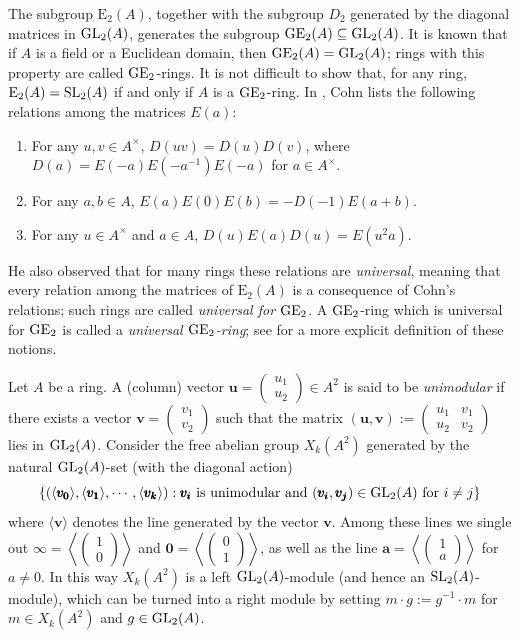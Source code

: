 \documentclass[11pt]{amsart}
\theoremstyle{definition}
\theoremstyle{plain}
\theoremstyle{definition}
\numberwithin{equation}{section}
\renewcommand{\aa}{{A^\times}}
\newcommand{\lan}{\langle}
\newcommand{\ran}{\rangle}
\newcommand{\GE}{{\rm GE}}
\newcommand{\Ee}{\mathrm{E}}
\newcommand{\GL}{\mathit{{\rm GL}}}
\newcommand{\SL}{\mathit{{\rm SL}}}
\newcommand {\mtx}[2]
{\left(\!\!\!
	\begin{array}{cc}
		#1 \\
		#2 
	\end{array}
	\!\!\!\right)}
\newcommand{\mtxx}[4]
{\left(\!\!
	\begin{array}{cc}
		\!\!#1 & \!\!#2\\
		\!\!#3 & \!\!#4
	\end{array}\!\!
	\right)}
\begin{document}
	The subgroup $\Ee_2(A)$, together with the subgroup $D_2$ generated by the diagonal matrices in $\GL_2(A)$, generates the subgroup $\GE_2(A)\subseteq \GL_2(A)$. It is known that if $A$ is a field or a Euclidean domain, then $\GE_2(A)=\GL_2(A)$; rings with this property are called $\GE_2$-rings. It is not difficult to show that, for any ring, $\Ee_2(A)=\SL_2(A)$ if and only if $A$ is a $\GE_2$-ring. In \cite{cohn1966}, Cohn lists the following relations among the matrices $E(a)$:
	\begin{enumerate}
		\item For any $u,v\in\aa$, $D(uv)=D(u)D(v)$, where $D(a)=E(-a)E(-a^{-1})E(-a)$ for $a\in\aa$.
		\item For any $a,b\in A$, $E(a)E(0)E(b)=-D(-1)E(a+b)$.
		\item For any $u\in\aa$ and $a\in A$, $D(u)E(a)D(u)=E(u^2a)$.
	\end{enumerate}
	
	He also observed that for many rings these relations are {\it universal}, meaning that every relation among the matrices of $\Ee_2(A)$ is a consequence of Cohn's relations; such rings are called {\it universal for $\GE_2$}. A $\GE_2$-ring which is universal for $\GE_2$ is called a {\it universal $\GE_2$-ring}; see \cite[\S 4]{hutchinson2022} for a more explicit definition of these notions.
	
	Let $A$ be a ring. A (column) vector $\pmb{u}=\mtx{u_1}{u_2}\in A^2$ is said to be \textit{unimodular} if there exists a vector $\pmb{v}=\mtx{v_1}{v_2}$ such that the matrix $(\pmb{u},\pmb{v}):=\mtxx{u_1}{v_1}{u_2}{v_2}$ lies in $\GL_2(A)$. Consider the free abelian group $X_k(A^2)$ generated by the natural $\GL_2(A)$-set (with the diagonal action)
	\[
	\{(\lan\pmb{v_0}\ran,\lan\pmb{v_1}\ran,\cdots,\lan\pmb{v_k}\ran): \pmb{v_i} \text{ is unimodular and } (\pmb{v_i},\pmb{v_j})\in \GL_2(A) \text{ for } i\neq j\}
	\]
	where $\lan \pmb{v}\ran$ denotes the line generated by the vector $\pmb{v}$. Among these lines we single out $\pmb{\infty}=\left\lan\mtx{1}{0}\right\ran$ and $\pmb{0}=\left\lan\mtx{0}{1}\right\ran$, as well as the line $\pmb{a}=\left\lan\mtx{1}{a}\right\ran$ for $a\neq 0$. In this way $X_k(A^2)$ is a left $\GL_2(A)$-module (and hence an $\SL_2(A)$-module), which can be turned into a right module by setting $m\cdot g:=g^{-1}\cdot m$ for $m\in X_k(A^2)$ and $g\in\GL_2(A)$.
	
\end{document}

